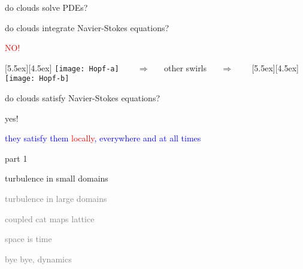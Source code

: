 \begin{frame}{do clouds solve PDEs?}

do clouds integrate Navier-Stokes equations?

\begin{center}
\centerline{\textcolor{red}{\Huge NO!}}

\begin{minipage}[t]{\textwidth}
	\begin{center}
\centerline{
\raisebox{-4.0ex}[5.5ex][4.5ex]
		 {\texttt{[image: Hopf-a]}}
~~~ $\Longrightarrow$ ~~ {other swirls} ~~ $\Longrightarrow$ ~~~
	\raisebox{-4.0ex}[5.5ex][4.5ex]
		 {\texttt{[image: Hopf-b]}}
          }
	\end{center}
\end{minipage}
\end{center}

do clouds satisfy Navier-Stokes equations?

\bigskip

{\Large yes!}

\centerline{
\textcolor{blue}{they satisfy them \textcolor{red}{\large locally}, everywhere and at all times}
}
\end{frame}

\begin{frame}{part 1}
\begin{enumerate}
              \item {\Large
turbulence in small domains
                  }\textcolor{gray}{\small
              \item
turbulence in large domains
              \item
coupled cat maps lattice
              \item
space is time
              \item
bye bye, dynamics
                    }
            \end{enumerate}
\end{frame}


